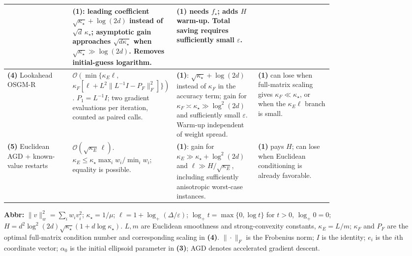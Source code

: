 \begin{table}[tp]
\begin{threeparttable}
\begin{tabularx}{\linewidth}{@{}>{\raggedright\arraybackslash}p{0.20\linewidth}>{\raggedright\arraybackslash}p{0.32\linewidth}>{\raggedright\arraybackslash}p{0.25\linewidth}>{\raggedright\arraybackslash}X@{}}
& \textbf{(1)}: leading coefficient $\sqrt{\kappa_\star}+\log(2d)$ instead of $\sqrt d\,\kappa_\star$; asymptotic gain approaches $\sqrt{d\kappa_\star}$ when $\sqrt{\kappa_\star}\gg\log(2d)$. Removes initial-guess logarithm.
& \textbf{(1)} needs $f_\star$; adds $H$ warm-up. Total saving requires sufficiently small $\varepsilon$. \\
\midrule
\textbf{(4)} Lookahead OSGM-R \citep[Eq.~(5), Thms.~6.1--6.2]{diagGao2025v2}
& $\mathcal{O}\!\left(\min\{\kappa_E\ell,\right.$\newline
$\left.\kappa_F[\ell+L^2\|L^{-1}I-P_F\|_F^2]\}\right)$.
$P_1=L^{-1}I$; two gradient evaluations per iteration, counted as paired calls.
& \textbf{(1)}: $\sqrt{\kappa_\star}+\log(2d)$ instead of $\kappa_F$ in the accuracy term; gain for $\kappa_F\asymp\kappa_\star\gg\log^2(2d)$ and sufficiently small $\varepsilon$. Warm-up independent of weight spread.
& \textbf{(1)} can lose when full-matrix scaling gives $\kappa_F\ll\kappa_\star$, or when the $\kappa_E\ell$ branch is small. \\
\midrule
\textbf{(5)} Euclidean AGD + known-value restarts \citep[Prop.~4.1]{diagRoulet2019v2}
& $\mathcal{O}(\sqrt{\kappa_E}\,\ell)$.
$\kappa_E\le\kappa_\star\max_i w_i/\min_i w_i$; equality is possible.
& \textbf{(1)}: gain for $\kappa_E\gg\kappa_\star+\log^2(2d)$ and $\ell\gg H/\sqrt{\kappa_E}$, including sufficiently anisotropic worst-case instances.
& \textbf{(1)} pays $H$; can lose when Euclidean conditioning is already favorable. \\
\bottomrule
\end{tabularx}
\begin{tablenotes}[flushleft]\footnotesize
\item[] \textbf{Abbr:} $\|v\|_w^2=\sum_i w_i v_i^2$; $\kappa_\star=1/\mu$; $\ell=1+\log_+(\Delta/\varepsilon)$; $\log_+t=\max\{0,\log t\}$ for $t>0$, $\log_+0=0$;
$H=d^2\log^2(2d)\sqrt{\kappa_\star}(1+d\log\kappa_\star)$.
$L,m$ are Euclidean smoothness and strong-convexity constants, $\kappa_E=L/m$; $\kappa_F$ and $P_F$ are the optimal full-matrix condition number and corresponding scaling in \textbf{(4)}. $\|\cdot\|_F$ is the Frobenius norm; $I$ is the identity; $e_i$ is the $i$th coordinate vector; $\alpha_0$ is the initial ellipsoid parameter in \textbf{(3)}; AGD denotes accelerated gradient descent.
\end{tablenotes}
\end{threeparttable}
\end{table}
\clearpage
